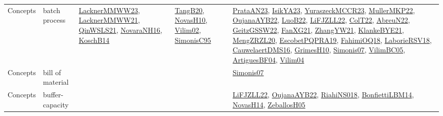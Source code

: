 {\begin{longtable}{lp{3cm}>{\raggedright}p{6cm}>{\raggedright}p{6cm}p{8cm}}
Concepts & batch process & \href{articles/LacknerMMWW23.pdf}{LacknerMMWW23}\cite{LacknerMMWW23}, \href{papers/LacknerMMWW21.pdf}{LacknerMMWW21}\cite{LacknerMMWW21}, \href{articles/QinWSLS21.pdf}{QinWSLS21}\cite{QinWSLS21}, \href{articles/NovaraNH16.pdf}{NovaraNH16}\cite{NovaraNH16}, \href{papers/KoschB14.pdf}{KoschB14}\cite{KoschB14} & \href{papers/TangB20.pdf}{TangB20}\cite{TangB20}, \href{articles/NovasH10.pdf}{NovasH10}\cite{NovasH10}, \href{papers/Vilim02.pdf}{Vilim02}\cite{Vilim02}, \href{papers/SimonisC95.pdf}{SimonisC95}\cite{SimonisC95} & \href{articles/PrataAN23.pdf}{PrataAN23}\cite{PrataAN23}, \href{articles/IsikYA23.pdf}{IsikYA23}\cite{IsikYA23}, \href{articles/YuraszeckMCCR23.pdf}{YuraszeckMCCR23}\cite{YuraszeckMCCR23}, \href{articles/MullerMKP22.pdf}{MullerMKP22}\cite{MullerMKP22}, \href{papers/OujanaAYB22.pdf}{OujanaAYB22}\cite{OujanaAYB22}, \href{papers/LuoB22.pdf}{LuoB22}\cite{LuoB22}, \href{papers/LiFJZLL22.pdf}{LiFJZLL22}\cite{LiFJZLL22}, \href{articles/ColT22.pdf}{ColT22}\cite{ColT22}, \href{articles/AbreuN22.pdf}{AbreuN22}\cite{AbreuN22}, \href{papers/GeitzGSSW22.pdf}{GeitzGSSW22}\cite{GeitzGSSW22}, \href{articles/FanXG21.pdf}{FanXG21}\cite{FanXG21}, \href{articles/ZhangYW21.pdf}{ZhangYW21}\cite{ZhangYW21}, \href{papers/KlankeBYE21.pdf}{KlankeBYE21}\cite{KlankeBYE21}, \href{articles/MengZRZL20.pdf}{MengZRZL20}\cite{MengZRZL20}, \href{articles/EscobetPQPRA19.pdf}{EscobetPQPRA19}\cite{EscobetPQPRA19}, \href{articles/FahimiOQ18.pdf}{FahimiOQ18}\cite{FahimiOQ18}, \href{articles/LaborieRSV18.pdf}{LaborieRSV18}\cite{LaborieRSV18}, \href{papers/CauwelaertDMS16.pdf}{CauwelaertDMS16}\cite{CauwelaertDMS16}, \href{papers/GrimesH10.pdf}{GrimesH10}\cite{GrimesH10}, \href{articles/Simonis07.pdf}{Simonis07}\cite{Simonis07}, \href{articles/VilimBC05.pdf}{VilimBC05}\cite{VilimBC05}, \href{papers/ArtiguesBF04.pdf}{ArtiguesBF04}\cite{ArtiguesBF04}, \href{papers/Vilim04.pdf}{Vilim04}\cite{Vilim04}\\
Concepts & bill of material &  &  & \href{articles/Simonis07.pdf}{Simonis07}\cite{Simonis07}\\
Concepts & buffer-capacity &  &  & \href{papers/LiFJZLL22.pdf}{LiFJZLL22}\cite{LiFJZLL22}, \href{papers/OujanaAYB22.pdf}{OujanaAYB22}\cite{OujanaAYB22}, \href{papers/RiahiNS018.pdf}{RiahiNS018}\cite{RiahiNS018}, \href{articles/BonfiettiLBM14.pdf}{BonfiettiLBM14}\cite{BonfiettiLBM14}, \href{articles/NovasH14.pdf}{NovasH14}\cite{NovasH14}, \href{articles/ZeballosH05.pdf}{ZeballosH05}\cite{ZeballosH05}\\

\end{longtable}}
